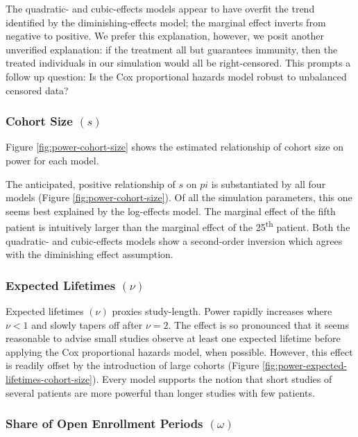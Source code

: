 
The quadratic- and cubic-effects models appear to have overfit the trend identified by the diminishing-effects model; the marginal effect inverts from negative to positive. We prefer this explanation, however, we posit another unverified explanation: if the treatment all but guarantees immunity, then the treated individuals in our simulation would all be right-censored. This prompts a follow up question: Is the Cox proportional hazards model robust to unbalanced censored data? 

\subsubsection{Cohort Size $(s)$}

Figure \ref{fig:power-cohort-size} shows the estimated relationship of cohort size on power for each model. 

The anticipated, positive relationship of $s$ on $pi$ is substantiated by all four models (Figure \ref{fig:power-cohort-size}). Of all the simulation parameters, this one seems best explained by the log-effects model. The marginal effect of the fifth patient is intuitively larger than the marginal effect of the 25\textsuperscript{th} patient. Both the quadratic- and cubic-effects models show a second-order inversion which agrees with the diminishing effect assumption. 

\subsubsection{Expected Lifetimes $(\nu)$}

Expected lifetimes $(\nu)$ proxies study-length. Power rapidly increases where $\nu < 1$ and slowly tapers off after $\nu = 2$. The effect is so pronounced that it seems reasonable to advise small studies observe at least one expected lifetime before applying the Cox proportional hazards model, when possible. However, this effect is readily offset by the introduction of large cohorts (Figure \ref{fig:power-expected-lifetimes-cohort-size}). Every model supports the notion that short studies of several patients are more powerful than longer studies with few patients. 

\subsubsection{Share of Open Enrollment Periods $(\omega)$}

